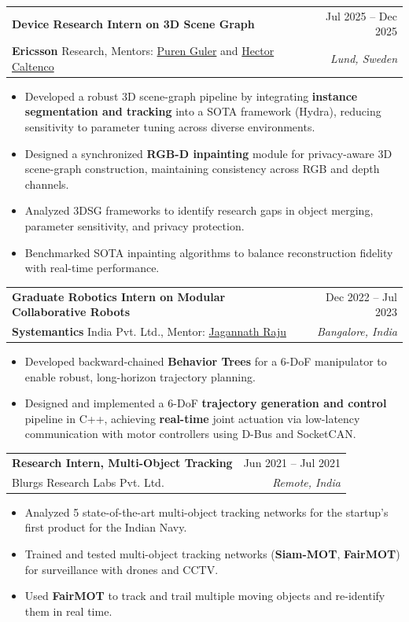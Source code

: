 \documentclass[letterpaper, 11pt]{article}
\makeatletter
\newcommand{\resumeItem}[1]{ \item\small{ {#1 \vspace{-2pt}} } }
\newcommand{\resumeSubheading}[4]{
\vspace{-1pt}
\item
\begin{tabular*}{1.0\textwidth}[t]{l@{\extracolsep{\fill}}r}
	\textbf{#1}       & {\small #2} \\
	{\small#3} & \textit{\small #4} \\
\end{tabular*}
\vspace{-10pt}
}
\newcommand{\resumeItemListStart}{\begin{itemize}[leftmargin=0.25in]}
\newcommand{\resumeItemListEnd}{\end{itemize}
\vspace{-5pt}}
\makeatother
\begin{document}
    \resumeSubheading{Device Research Intern on 3D Scene Graph}{Jul 2025 -- Dec 2025}{\textbf{Ericsson} Research, Mentors:
    \href{https://se.linkedin.com/in/p\%C3\%BCren-g\%C3\%BCler-76457317}{{Puren Guler}} and 
    \href{https://se.linkedin.com/in/hcaltenco}{Hector Caltenco}}{Lund, Sweden} 
    \resumeItemListStart 
        \resumeItem{Developed a robust 3D scene-graph pipeline by integrating \textbf{instance segmentation and tracking} into a SOTA framework (Hydra), reducing sensitivity to parameter tuning across diverse environments.}
        \resumeItem{Designed a synchronized \textbf{RGB-D inpainting} module for privacy-aware 3D scene-graph construction, maintaining consistency across RGB and depth channels.}
        \resumeItem{Analyzed 3DSG frameworks to identify research gaps in object merging, parameter sensitivity, and privacy protection.}
        \resumeItem{Benchmarked SOTA inpainting algorithms to balance reconstruction fidelity with real-time performance.}
    \resumeItemListEnd

    \resumeSubheading{Graduate Robotics Intern on Modular Collaborative Robots}{Dec 2022 -- Jul 2023}{\textbf{Systemantics} India Pvt. Ltd., Mentor: \href{https://www.linkedin.com/in/jagannathraju/}{{Jagannath Raju}}}{Bangalore, India}
    \resumeItemListStart 
        \resumeItem{Developed backward-chained \textbf{Behavior Trees} for a 6-DoF manipulator to enable robust, long-horizon trajectory planning.}
        \resumeItem{Designed and implemented a 6-DoF \textbf{trajectory generation and control} pipeline in C++, achieving \textbf{real-time} joint actuation via low-latency communication with motor controllers using D-Bus and SocketCAN.}
    \resumeItemListEnd
    \resumeSubheading{Research Intern, Multi-Object Tracking}{Jun 2021 -- Jul 2021}{Blurgs Research Labs Pvt. Ltd.}{Remote, India}
    \resumeItemListStart
        \resumeItem{Analyzed 5 state-of-the-art multi-object tracking networks for the startup's first product for the Indian Navy.}
        \resumeItem{Trained and tested multi-object tracking networks (\textbf{Siam-MOT}, \textbf{FairMOT}) for surveillance with drones and CCTV.}
        \resumeItem{Used \textbf{FairMOT} to track and trail multiple moving objects and re-identify them in real time.}
    \resumeItemListEnd
\end{document}

